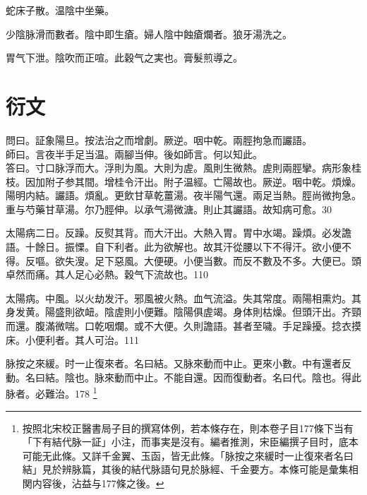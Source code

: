 \documentclass[b5paper,twoside,zihao=-4,UTF8]{ctexbook}
\begin{document}
蛇床子散。温陰中坐藥。

少陰脉滑而數者。陰中即生瘡。{婦人}陰中蝕瘡爛者。狼牙湯洗之。

胃气下泄。陰吹而正喧。此穀气之実也。膏髮煎導之。

\part{衍文}

問曰。証象陽旦。按法治之而增劇。厥逆。咽中乾。兩脛拘急而讝語。\\
師曰。言夜半手足当温。兩腳当伸。後如師言。何以知此。\\
答曰。寸口脉浮而大。浮{則}为風。大{則}为虗。風則生微熱。虗則兩脛攣。病形象桂枝。因加附子参其間。增桂令汗出。附子温經。亡陽故也。厥逆。咽中乾。煩燥。陽明内結。讝語。煩亂。更飲甘草乾薑湯。夜半陽气還。兩足当熱。脛尚微拘急。重与芍藥甘草湯。尔乃脛伸。以承气湯微溏。則止其讝語。故知病可愈。30

太陽病二日。反躁。反熨其背。而大汗出。大熱入胃。胃中水竭。躁煩。必发譫語。十餘日。振慄。自下利者。此为欲解也。故其汗從腰以下不得汗。欲小便不得。反嘔。欲失溲。足下惡風。大便硬。小便当數。而反不數及不多。大便已。頭卓然而痛。其人足心必熱。穀气下流故也。110

太陽病。中風。以火劫发汗。邪風被火熱。血气流溢。失其常度。兩陽相熏灼。其身发黄。陽盛則欲衄。陰虗{則}小便難。陰陽俱虗竭。身体則枯燥。但頭汗出。齐頸而還。腹滿微喘。口乾咽爛。或不大便。久則譫語。甚者至噦。手足躁擾。捻衣摸床。小便利者。其人可治。111

脉按之來緩。时一止復來者。名曰結。又脉來動而中止。更來小數。中有還者反動。名曰結。陰也。脉來動而中止。不能自還。因而復動者。名曰代。陰也。得此脉者。必難治。178
\footnote{按照北宋校正醫書局子目的撰寫体例，若本條存在，則本卷子目177條下当有「下有結代脉一証」小注，而事実是沒有。編者推測，宋臣編撰子目时，底本可能无此條。又詳千金翼、玉函，皆无此條。「脉按之來緩时一止復來者名曰結」見於辨脉篇，其後的結代脉語句見於脉經、千金要方。本條可能是彙集相関内容後，沾益与177條之後。}
\end{document}
